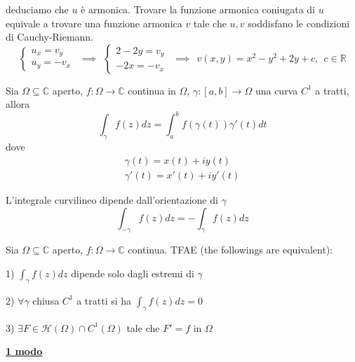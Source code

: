 deduciamo che $u$ è armonica. Trovare la funzione armonica coniugata di $u$ equivale a trovare una funzione armonica $v$ tale che $u,v$ soddisfano le condizioni di Cauchy-Riemann.
\begin{equation*}
\begin{cases}
u_{x} =v_{y}\\
u_{y} =-v_{x}
\end{cases} \ \ \implies \ \ \begin{cases}
2-2y=v_{y}\\
-2x=-v_{x}
\end{cases} \ \ \implies \ \ v\left( x,y\right) =x^{2} -y^{2} +2y+c,\ \ c\in \mathbb{R}
\end{equation*}
\Soluzione
\begin{defn}
Sia $\Omega \subseteq \mathbb{C}$ aperto, $f:\Omega \rightarrow \mathbb{C}$ continua in $\Omega $, $\gamma :\left[ a,b\right]\rightarrow \Omega $ una curva $C^{1}$ a tratti, allora
\begin{equation*}
\int\nolimits _{\gamma } f\left( z\right) dz=\int\nolimits ^{b}_{a} f\left( \gamma \left( t\right)\right) \gamma '\left( t\right) dt
\end{equation*}
dove
\begin{gather*}
\gamma \left( t\right) =x\left( t\right) +iy\left( t\right)\\
\gamma '\left( t\right) =x'\left( t\right) +iy'\left( t\right)
\end{gather*}
\end{defn}
\begin{rem}
L'integrale curvilineo dipende dall'orientazione di $\gamma $
\begin{equation*}
\int\nolimits _{-\gamma } f\left( z\right) dz=-\int\nolimits _{\gamma } f\left( z\right) dz
\end{equation*}
\end{rem}
\begin{thm}
Sia $\Omega \subseteq \mathbb{C}$ aperto, $f:\Omega \rightarrow \mathbb{C}$ continua. TFAE (the followings are equivalent):

1) $\int _{\gamma } f\left( z\right) dz$ dipende solo dagli estremi di $\gamma $

2) $\forall \gamma $ chiusa $C^{1}$ a tratti si ha $\int _{\gamma } f\left( z\right) dz=0$

3) $\exists F\in \mathcal{H}\left( \Omega \right) \cap C^{1}\left( \Omega \right)$ tale che $F'=f$ in $\Omega $
\end{thm}
\textbf{\underline{1 modo}}
